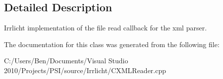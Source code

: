 \subsection{Detailed Description}
Irrlicht implementation of the file read callback for the xml parser. 

The documentation for this class was generated from the following file\-:\begin{DoxyCompactItemize}
\item 
C\-:/\-Users/\-Ben/\-Documents/\-Visual Studio 2010/\-Projects/\-P\-S\-I/source/\-Irrlicht/C\-X\-M\-L\-Reader.\-cpp\end{DoxyCompactItemize}
